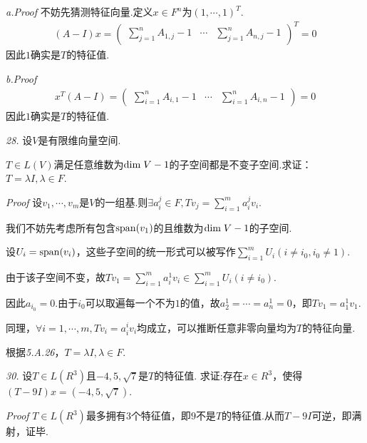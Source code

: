 \textit{a.Proof}
不妨先猜测特征向量.定义\(x \in F^n\)为\((1,\cdots,1)^T\).
    \begin{align*}
        (A-I)x=
            \begin{pmatrix}
                \sum_{j=1}^n A_{1,j}-1 & \cdots & \sum_{j=1}^n A_{n,j}-1
            \end{pmatrix}^T
            =0
    \end{align*}
因此\(1\)确实是\(T\)的特征值.

\textit{b.Proof}
    \begin{align*}
        x^T(A-I)=
            \begin{pmatrix}
                \sum_{i=1}^n A_{i,1}-1 & \cdots & \sum_{i=1}^n A_{i,n}-1
            \end{pmatrix}
                =0
    \end{align*}
因此\(1\)确实是\(T\)的特征值.

\hspace*{\fill}

\textit{28.}
设\(V\)是有限维向量空间.

\(T \in L(V)\)满足任意维数为\(\mathrm{dim \;} V-1\)的子空间都是不变子空间.求证：\(T=\lambda I,\lambda \in F\).

\textit{Proof}
设\(v_1,\cdots,v_m\)是\(V\)的一组基.则\(\exists a_i^j \in F,Tv_j=\sum_{i=1}^m a_i^j v_i\).

我们不妨先考虑所有包含\(\mathrm{span} (v_1)\)的且维数为\(\mathrm{dim \;} V-1\)的子空间.

设\(U_i=\mathrm{span} (v_i)\)，这些子空间的统一形式可以被写作\(\sum_{i=1}^m U_i(i \ne i_0,i_0 \ne 1)\).

由于该子空间不变，故\(Tv_1=\sum_{i=1}^m a_i^1 v_i \in \sum_{i=1}^m U_i(i \ne i_0)\).

因此\(a_{i_0}=0\).由于\(i_0\)可以取遍每一个不为\(1\)的值，故\(a_2^1=\cdots=a_n^1=0\)，即\(Tv_1=a_1^1 v_1\).

同理，\(\forall i=1,\cdots,m,Tv_i=a_i^i v_i\)均成立，可以推断任意非零向量均为\(T\)的特征向量.

根据\textit{5.A.26}，\(T=\lambda I,\lambda \in F\).

\hspace*{\fill}

\textit{30.}
设\(T \in L(R^3)\)且\(-4,5,\sqrt{7}\)是\(T\)的特征值.
求证:存在\(x \in R^3\)，使得\((T-9I)x=(-4,5,\sqrt{7})\).

\textit{Proof}
\(T \in L(R^3)\)最多拥有\(3\)个特征值，即\(9\)不是\(T\)的特征值.从而\(T-9I\)可逆，即满射，证毕.

\newpage

